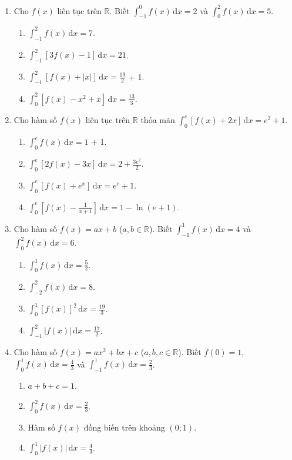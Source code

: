 \documentclass[12pt]{article}
\begin{document}
\begin{enumerate}[label=\textbf{Câu \arabic*.}]
		\item Cho $f(x)$ liên tục trên $\mathbb{R}$. Biết $\displaystyle \int_{-1}^0 f(x)\,\mathrm{d}x = 2$ và $\displaystyle \int_0^2 f(x)\,\mathrm{d}x = 5$.
		\begin{enumerate}[label=\alph*)]			\item $\displaystyle \int_{-1}^2 f(x)\,\mathrm{d}x = 7$.
			\item $\displaystyle \int_{-1}^2 [3f(x) - 1]\,\mathrm{d}x = 21$.
			\item $\displaystyle \int_{-1}^2 [f(x) + |x|]\,\mathrm{d}x = \frac{19}{2}$ + 1.
			\item $\displaystyle \int_0^2 [f(x) - x^2 + x]\,\mathrm{d}x = \frac{13}{3}$.
\end{enumerate}
		
		\item Cho hàm số $f(x)$ liên tục trên $\mathbb{R}$ thỏa mãn $\displaystyle \int_0^e [f(x) + 2x]\,\mathrm{d}x = e^2 + 1$.
		\begin{enumerate}[label=\alph*)]			\item $\displaystyle \int_0^e f(x)\,\mathrm{d}x = 1$ + 1.
			\item $\displaystyle \int_0^e [2f(x) - 3x]\,\mathrm{d}x = 2 + \frac{3e^2}{2}$.
			\item $\displaystyle \int_0^e [f(x) + e^x]\,\mathrm{d}x = e^e + 1$.
			\item $\displaystyle \int_0^e \left[f(x) - \frac{1}{x+1}\right]\,\mathrm{d}x = 1 - \ln(e+1)$.
\end{enumerate}

		\item Cho hàm số $f(x) = ax + b$ ($a, b \in \mathbb{R}$). Biết $\displaystyle \int_{-1}^1 f(x)\,\mathrm{d}x = 4$ và $\displaystyle \int_0^2 f(x)\,\mathrm{d}x = 6$.
		\begin{enumerate}[label=\alph*)]
			\item $\displaystyle \int_0^1 f(x)\,\mathrm{d}x = \frac{5}{2}$.
			\item $\displaystyle \int_{-2}^2 f(x)\,\mathrm{d}x = 8$.
			\item $\displaystyle \int_0^1 [f(x)]^2\,\mathrm{d}x = \frac{19}{3}$.
			\item $\displaystyle \int_{-1}^2 |f(x)|\,\mathrm{d}x = \frac{17}{2}$.
		\end{enumerate}
		
		\item Cho hàm số $f(x) = ax^2 + bx + c$ ($a, b, c \in \mathbb{R}$). Biết $f(0) = 1$, $\displaystyle \int_0^1 f(x)\,\mathrm{d}x = \frac{4}{3}$ và $\displaystyle \int_{-1}^1 f(x)\,\mathrm{d}x = \frac{2}{3}$.
		\begin{enumerate}[label=\alph*)]
			\item $a + b + c = 1$.
			\item $\displaystyle \int_0^2 f(x)\,\mathrm{d}x = \frac{2}{3}$.
			\item Hàm số $f(x)$ đồng biến trên khoảng $(0; 1)$.
			\item $\displaystyle \int_0^1 |f(x)|\,\mathrm{d}x = \frac{4}{3}$.
		\end{enumerate}
		

\end{enumerate}
\end{document}
